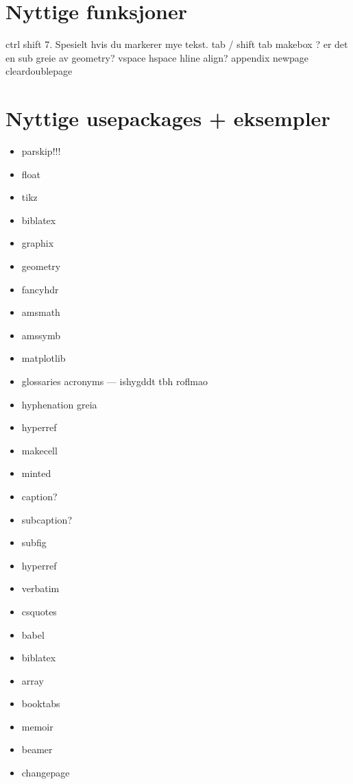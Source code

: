 \section{Nyttige funksjoner}
    ctrl shift 7. Spesielt hvis du markerer mye tekst.
    tab / shift tab
    makebox ? er det en sub greie av geometry?
    vspace
    hspace
    hline
    align?
    appendix
    newpage
    cleardoublepage
    

\section{Nyttige usepackages + eksempler}
\begin{itemize}
    \item parskip!!!
    \item float
    \item tikz
    \item biblatex
    \item graphix
    \item geometry %
    \item fancyhdr
    \item amsmath
    \item amssymb
    \item matplotlib
    \item glossaries acronyms --- ishygddt tbh roflmao
    \item hyphenation greia
    \item hyperref
    \item makecell
    \item minted
    \item caption?
    \item subcaption?
    \item subfig
    \item hyperref %
    \item verbatim %
    \item csquotes %
    \item babel %
    \item biblatex 
    \item array
    \item booktabs
    \item memoir
    \item beamer
    \item changepage
\end{itemize}

